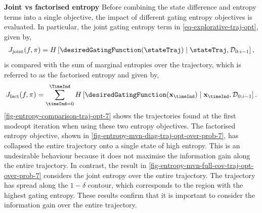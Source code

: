 \documentclass{mimosis-class/mimosis}
\numberwithin{equation}{chapter}
\newcommand{\state}{\ensuremath{\mathbf{x}}}
\newcommand{\dataset}{\ensuremath{\mathcal{D}}}
\begin{document}
{\newline

\textbf{Joint vs factorised entropy}
Before combining the state difference and entropy terms into a single objective,
the impact of different gating entropy objectives is evaluated.
In particular, the joint gating entropy term in \cref{eq-explorative-traj-opt}, given by,
\begin{align} \label{eq-joint-entropy}
J_{\text{joint}}(f, \pi) = H \left[ \desiredGatingFunction(\stateTraj) \mid \stateTraj, \dataset_{0:i-1} \right],
\end{align}
is compared with the sum of marginal
entropies over the trajectory, which is referred to as the factorised entropy and given by,
\begin{align} \label{eq-factorised-entropy}
J_{\text{fact}}(f, \pi) = \sum_{\timeInd=0}^{\TimeInd}
H \left[ \desiredGatingFunction(\state_{\timeInd}) \mid \state_{\timeInd}, \dataset_{0:i-1} \right].
\end{align}
\cref{fig-entropy-comparison-traj-opt-7} shows the trajectories found at the first \acrshort{modeopt} iteration
when using these two entropy objectives.
The factorised entropy objective, shown in
\cref{fig-entropy-mvn-diag-traj-opt-over-prob-7}, has collapsed the entire trajectory onto a single state
of high entropy.
This is an undesirable behaviour because it does not maximise the information gain along the entire trajectory.
In contrast, the result in \cref{fig-entropy-mvn-full-cov-traj-opt-over-prob-7} considers the joint entropy over
the entire trajectory. The trajectory has spread along the \(1-\delta\) contour,
which corresponds to the region with the highest gating entropy.
These results confirm that it is important to consider the information gain over the entire trajectory.

}
\end{document}
